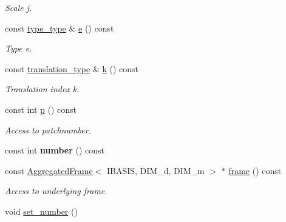 \begin{CompactItemize}
\begin{CompactList}\small\item\em Scale j. \item\end{CompactList}\item 
\hypertarget{classFrameTL_1_1FrameIndex_21c1b8da042b7cd8334c0305dc3cb6ae}{
const \hyperlink{classFrameTL_1_1FrameIndex_e92c4f89e747a61eb2f7275d0bd01e25}{type\_\-type} \& \hyperlink{classFrameTL_1_1FrameIndex_21c1b8da042b7cd8334c0305dc3cb6ae}{e} () const }
\label{classFrameTL_1_1FrameIndex_21c1b8da042b7cd8334c0305dc3cb6ae}

\begin{CompactList}\small\item\em Type e. \item\end{CompactList}\item 
\hypertarget{classFrameTL_1_1FrameIndex_4b985d503a14b4216e99894cf3dd6d27}{
const \hyperlink{classFrameTL_1_1FrameIndex_222e44072cf0330c11cd157d4a1ff6a1}{translation\_\-type} \& \hyperlink{classFrameTL_1_1FrameIndex_4b985d503a14b4216e99894cf3dd6d27}{k} () const }
\label{classFrameTL_1_1FrameIndex_4b985d503a14b4216e99894cf3dd6d27}

\begin{CompactList}\small\item\em Translation index k. \item\end{CompactList}\item 
\hypertarget{classFrameTL_1_1FrameIndex_f3d52f4721497864a84ea422d218501d}{
const int \hyperlink{classFrameTL_1_1FrameIndex_f3d52f4721497864a84ea422d218501d}{p} () const }
\label{classFrameTL_1_1FrameIndex_f3d52f4721497864a84ea422d218501d}

\begin{CompactList}\small\item\em Access to patchnumber. \item\end{CompactList}\item 
\hypertarget{classFrameTL_1_1FrameIndex_f286dcbaa43d16e76a742abeee34f254}{
const int \textbf{number} () const }
\label{classFrameTL_1_1FrameIndex_f286dcbaa43d16e76a742abeee34f254}

\item 
\hypertarget{classFrameTL_1_1FrameIndex_04b51dc7a09ded0da87b421fad421c19}{
const \hyperlink{classFrameTL_1_1AggregatedFrame}{AggregatedFrame}$<$ IBASIS, DIM\_\-d, DIM\_\-m $>$ $\ast$ \hyperlink{classFrameTL_1_1FrameIndex_04b51dc7a09ded0da87b421fad421c19}{frame} () const }
\label{classFrameTL_1_1FrameIndex_04b51dc7a09ded0da87b421fad421c19}

\begin{CompactList}\small\item\em Access to underlying frame. \item\end{CompactList}\item 
void \hyperlink{classFrameTL_1_1FrameIndex_e616e586eab66c5b4109f73dd5e11017}{set\_\-number} ()
\end{CompactItemize}
